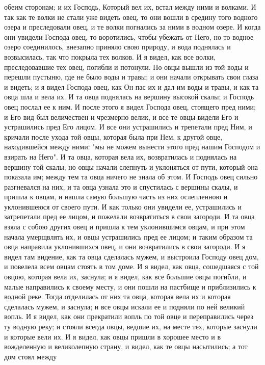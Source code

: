 обеим сторонам; и их Господь, Который вел их, встал между ними и волками.
И так как те волки не стали уже видеть овец, то они вошли в средину
того водного озера и преследовали овец, и те волки погнались за ними в водном
озере.
И когда они увидели Господа овец, то воротились, чтобы убежать от
Него, но то водное озеро соединилось, внезапно приняло свою природу, и вода
поднялась и возвысилась, так что покрыла тех волков.
И я видел, как все волки, преследовавшие тех овец, погибли и потонули.
Но овцы вышли из той воды и перешли пустыню, где не было воды и травы;
и они начали открывать свои глаза и видеть; и я видел Господа овец, как Он пас
их и дал им воды и травы, и как та овца шла и вела их.
И та овца поднялась на вершину высокой скалы; и Господь овец послал ее
к ним.
И после этого я видел Господа овец, стоящего пред ними; и Его вид был
величествен и чрезмерно велик, и все те овцы видели Его и устрашились пред Его
лицом.
И все они устрашились и трепетали пред Ним, и кричали после ухода той
овцы, которая была при Нем, к другой овце, находившейся между ними: "мы не
можем вынести этого пред нашим Господом и взирать на Него".
И та овца, которая вела их, возвратилась и поднялась на вершину той
скалы; но овцы начали слепнуть и уклоняться от пути, который она показала им;
между тем та овца ничего не знала об этом.
И Господь овец сильно разгневался на них, и та овца узнала это и
спустилась с вершины скалы, и пришла к овцам, и нашла самую большую часть из
них ослепленною и уклонившеюся от своего пути.
И как только они увидели ее, устрашились и затрепетали пред ее лицом,
и пожелали возвратиться в свои загороди.
И та овца взяла с собою других овец и пришла к тем уклонившимся овцам,
и при этом начала умерщвлять их, и овцы устрашились пред ее лицом; и таким
образом та овца направила уклонившихся овец, и они возвратились в свои
загороди.
И я видел там видение, как та овца сделалась мужем, и выстроила
Господу овец дом, и повелела всем овцам стоять в том доме.
И я видел, как овца, сошедшаяся с той овцою, которая вела их, заснула;
и я видел, как все большие овцы погибли, и малые направились к своему месту, и
они пошли на пастбище и приблизились к водной реке.
Тогда отделилась от них та овца, которая вела их и которая сделалась
мужем, и заснула; и все овцы искали ее и подняли по ней великий вопль.
И я видел, как они прекратили вопль по той овце и переправились через
ту водную реку; и стояли всегда овцы, ведшие их, на месте тех, которые заснули
и которые вели их.
И я видел, как овцы пришли в хорошее место и в вожделенную и
великолепную страну, и видел, как те овцы насытились; а тот дом стоял между
